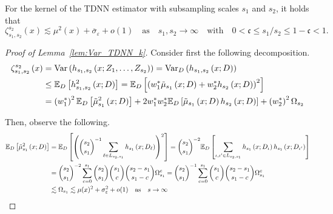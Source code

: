 \begin{boxD}
    \begin{lem}\label{lem:Var_TDNN_k}
	For the kernel of the TDNN estimator with subsampling scales $s_1$ and $s_2$, it holds that
	\begin{equation}
		\zeta_{s_1, s_2}^{s_2}\left(x\right)
		\lesssim \mu^2(x) + \overline{\sigma}_{\varepsilon} + o(1)
		\quad \text{as} \quad s_1, s_2 \rightarrow \infty
		\quad \text{with} \quad
		0 < \mathfrak{c} \leq s_1 / s_2 \leq 1 - \mathfrak{c} < 1.
	\end{equation}
\end{lem}
\end{boxD}

\begin{proof}[Proof of Lemma~\ref{lem:Var_TDNN_k}]
	Consider first the following decomposition.
	\begin{equation}
		\begin{aligned}
			\zeta_{s_1, s_2}^{s_2}\left(x\right)
			 & = \text{Var}\left(h_{s_1, s_2}\left(x; Z_1, \ldots, Z_{s_2}\right)\right)
			= \text{Var}_{D}\left(h_{s_1, s_2}\left(x; D\right)\right)                                     \\
			 & \leq \mathbb{E}_{D}\left[h_{s_1, s_2}^{2}\left(x; D\right)\right]
			= \mathbb{E}_{D}\left[
				\left(w_{1}^{*}\tilde{\mu}_{s_1}\left(x; D\right) + w_{2}^{*} h_{s_2}\left(x; D\right)\right)^2
			\right]                                                                                           \\
			 & = \left(w_{1}^{*}\right)^2\mathbb{E}_{D}\left[\tilde{\mu}_{s_1}^{2}\left(x; D\right)\right]
			+ 2 w_{1}^{*}w_{2}^{*} \mathbb{E}_{D}\left[\tilde{\mu}_{s_1}\left(x; D\right) h_{s_2}\left(x; D\right)\right]
			+ \left(w_{2}^{*}\right)^2\Omega_{s_2}
		\end{aligned}
	\end{equation}

	Then, observe the following.
	\begin{equation}
		\begin{aligned}
			\mathbb{E}_{D}\left[\tilde{\mu}_{s_1}^{2}\left(x; D\right)\right]
			 & = \mathbb{E}_D\left[\left(\binom{s_2}{s_1}^{-1}\sum_{\ell \in L_{s_2, s_1}} h_{s_1}\left(x; D_{\ell}\right)\right)^2\right]
			= \binom{s_2}{s_1}^{-2} \mathbb{E}_{D}\left[\sum_{\iota, \iota' \in L_{s_2, s_1}}h_{s_1}\left(x; D_{\iota}\right)h_{s_1}\left(x; D_{\iota'}\right)\right] \\
			 & = \binom{s_2}{s_1}^{-2} \sum_{c = 0}^{s_1} \binom{s_2}{s_1}\binom{s_1}{c}\binom{s_2 - s_1}{s_1 - c} \Omega_{s_1}^{c}
			= \binom{s_2}{s_1}^{-1} \sum_{c = 0}^{s_1} \binom{s_1}{c}\binom{s_2 - s_1}{s_1 - c} \Omega_{s_1}^{c}                                                                \\
			 & \lesssim \Omega_{s_1}
			\lesssim \mu(x)^2 + \sigma_{\varepsilon}^2 + o(1)
			\quad \text{as} \quad s \rightarrow \infty
		\end{aligned}
	\end{equation}


\end{proof}
